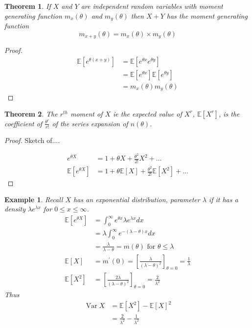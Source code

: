 \documentclass{notes}
\theoremstyle{plain}
\newtheorem{theorem}{Theorem}[chapter]
\newtheorem*{example}{Example}
\newcommand{\bE}{\mathbb{E}}
\newcommand{\expect}[1]{\bE\!\left[#1\right]}
\DeclareMathOperator{\var}{Var}
\begin{document}
\begin{theorem}
If $X$ and $Y$ are independent random variables with moment generating
function $m_x(\theta)$ and $m_y(\theta)$ then $X+Y$ has the moment
generating function
\[
m_{x +y} (\theta) = m_x(\theta) \times m_y(\theta)
\]
\end{theorem}


\begin{proof}
\begin{align*}
\expect{e^{\theta(x+y)}} &= \expect{e^{\theta x}e^{\theta y}}\\
&= \expect{e^{\theta x}}\expect{e^{\theta y}}\\
&=  m_x(\theta) m_y(\theta)
\end{align*}
\end{proof}

\begin{theorem}
The $r^{th}$ moment of $X$ ie the expected value of $X^r$,
$\expect{X^r}$, is the coefficient of $\frac{\theta^r}{r!}$ of the
series expansion of $n(\theta)$.
\end{theorem}

\begin{proof}
Sketch of....

\begin{align*}
e^{\theta X} &= 1 + \theta X + \frac{\theta^2}{2!}X^2 +\dots\\
\expect{e^{\theta X}}&= 1 + \theta \expect{X} +
\frac{\theta^2}{2!}\expect{X^2} +\dots
\end{align*}
\end{proof}

\begin{example}
Recall $X$ has an exponential distribution, parameter $\lambda$ if it
has a density $\lambda e^{\lambda x}$ for $ 0 \leq x \le \infty$.
\begin{align*}
\expect{e^{\theta X}}&= \int_{0}^{\infty} e^{\theta x}\lambda
e^{\lambda x}dx\\
&= \lambda \int_{0}^{\infty} e^{-(\lambda - \theta)x}dx\\
&= \frac{\lambda}{\lambda - \theta} = m(\theta) \text{ for } \theta
\le \lambda\\
\expect{X} &= m^{'}(0) = \left[\frac{\lambda}{(\lambda -
    \theta)^2}\right]_{\theta = 0} = \frac{1}{\lambda}\\
\expect{X^2} &=  \left[\frac{2\lambda}{(\lambda -
    \theta)^2}\right]_{\theta = 0} = \frac{2}{\lambda^2}
\end{align*}
Thus 
\begin{align*}
\var{X} &= \expect{X^2} - \expect{X}^2\\
&= \frac{2}{\lambda^2} -\frac{1}{\lambda^2}\\ 
\end{align*}
\end{example}
\end{document}
